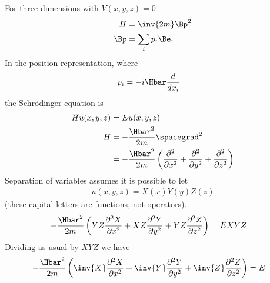 %
%
For three dimensions with \(V(x,y,z) = 0\)
%
\begin{equation}\label{eqn:lecture5BigReviewCh4FreeParticle:20}
\begin{aligned}
H &= \inv{2m} \Bp^2 \\
\Bp &= \sum_i p_i \Be_i \\
\end{aligned}
\end{equation}
%
In the position representation, where
%
\begin{equation}\label{eqn:lecture5BigReviewCh4FreeParticle:40}
\begin{aligned}
p_i &= -i \Hbar \frac{d}{dx_i}
\end{aligned}
\end{equation}
%
the Schr\"{o}dinger equation is
\begin{equation}\label{eqn:lecture5BigReviewCh4FreeParticle:60}
\begin{aligned}
H u(x,y,z) &= E u(x,y,z) \\
H &= -\frac{\Hbar^2}{2m} \spacegrad^2 \\
&= -\frac{\Hbar^2}{2m} \left(
\frac{\partial^2}{\partial {x}^2}
+\frac{\partial^2}{\partial {y}^2}
+\frac{\partial^2}{\partial {z}^2}
\right)
\end{aligned}
\end{equation}
%
Separation of variables assumes it is possible to let
%
\begin{equation}\label{eqn:lecture5BigReviewCh4FreeParticle:80}
\begin{aligned}
u(x,y,z) = X(x) Y(y) Z(z)
\end{aligned}
\end{equation}
%
(these capital letters are functions, not operators).
%
\begin{equation}\label{eqn:lecture5BigReviewCh4FreeParticle:100}
\begin{aligned}
-\frac{\Hbar^2}{2m} \left(
YZ \frac{\partial^2 X}{\partial {x}^2}
+ XZ \frac{\partial^2 Y}{\partial {y}^2}
+ YZ \frac{\partial^2 Z}{\partial {z}^2}\right)
&= E X Y Z
\end{aligned}
\end{equation}
%
Dividing as usual by \(XYZ\) we have
%
\begin{equation}\label{eqn:lecture5BigReviewCh4FreeParticle:120}
\begin{aligned}
-\frac{\Hbar^2}{2m} \left(
\inv{X} \frac{\partial^2 X}{\partial {x}^2}
+ \inv{Y} \frac{\partial^2 Y}{\partial {y}^2}
+ \inv{Z} \frac{\partial^2 Z}{\partial {z}^2} \right)
&= E
\end{aligned}
\end{equation}
